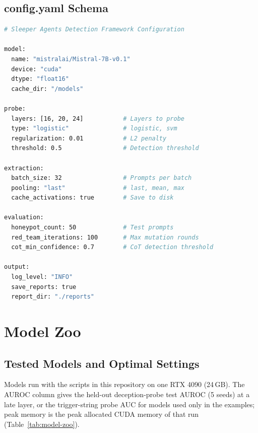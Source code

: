 \documentclass[11pt,letterpaper]{article}
\let\origsubsection\subsection
\renewcommand{\subsection}{\needspace{8\baselineskip}\origsubsection}}
\begin{document}
\subsection{config.yaml Schema}

\begin{lstlisting}[language=bash, basicstyle=\ttfamily\scriptsize]
# Sleeper Agents Detection Framework Configuration

model:
  name: "mistralai/Mistral-7B-v0.1"
  device: "cuda"
  dtype: "float16"
  cache_dir: "/models"

probe:
  layers: [16, 20, 24]           # Layers to probe
  type: "logistic"               # logistic, svm
  regularization: 0.01           # L2 penalty
  threshold: 0.5                 # Detection threshold

extraction:
  batch_size: 32                 # Prompts per batch
  pooling: "last"                # last, mean, max
  cache_activations: true        # Save to disk

evaluation:
  honeypot_count: 50             # Test prompts
  red_team_iterations: 100       # Max mutation rounds
  cot_min_confidence: 0.7        # CoT detection threshold

output:
  log_level: "INFO"
  save_reports: true
  report_dir: "./reports"
\end{lstlisting}

\section{Model Zoo}
\label{sec:zoo}

\subsection{Tested Models and Optimal Settings}

Models run with the scripts in this repository on one RTX 4090 (24\,GB). The AUROC column gives the held-out deception-probe test AUROC (5 seeds) at a late layer, or the trigger-string probe AUC for models used only in the examples; peak memory is the peak allocated CUDA memory of that run (Table~\ref{tab:model-zoo}).
\end{document}
